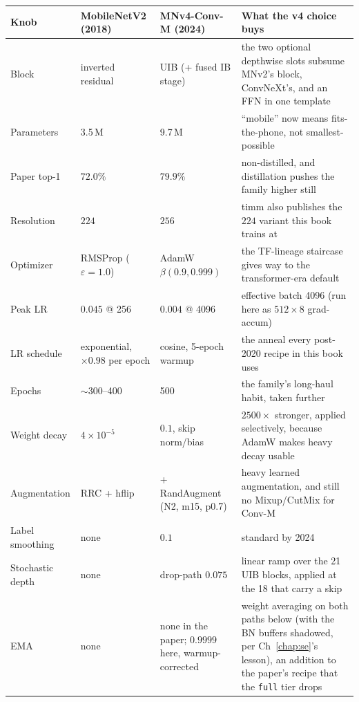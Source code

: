 \begin{center}
\begin{tabular}{@{}l p{2.9cm} p{3.2cm} p{6.3cm}@{}}
\hline
Knob & MobileNetV2 (2018) & MNv4-Conv-M (2024) & What the v4 choice buys \\
\hline
Block         & inverted residual      & UIB (+ fused IB stage)        & the two optional depthwise slots subsume MNv2's block, ConvNeXt's, and an FFN in one template \\
Parameters    & 3.5\,M                 & 9.7\,M                        & ``mobile'' now means fits-the-phone, not smallest-possible \\
Paper top-1   & $72.0\%$               & $79.9\%$                      & non-distilled, and distillation pushes the family higher still \\
Resolution    & $224$                  & $256$                         & timm also publishes the $224$ variant this book trains at \\
Optimizer     & RMSProp ($\varepsilon{=}1.0$) & AdamW $\beta(0.9, 0.999)$ & the TF-lineage staircase gives way to the transformer-era default \\
Peak LR       & $0.045$ @ 256          & $0.004$ @ 4096                & effective batch 4096 (run here as $512 \times 8$ grad-accum) \\
LR schedule   & exponential, $\times0.98$ per epoch & cosine, 5-epoch warmup & the anneal every post-2020 recipe in this book uses \\
Epochs        & $\sim$300--400         & 500                           & the family's long-haul habit, taken further \\
Weight decay  & $4\times10^{-5}$       & $0.1$, skip norm/bias         & $2500\times$ stronger, applied selectively, because AdamW makes heavy decay usable \\
Augmentation  & RRC + hflip            & + RandAugment (N2, m15, p0.7) & heavy learned augmentation, and still no Mixup/CutMix for Conv-M \\
Label smoothing & none                 & $0.1$                         & standard by 2024 \\
Stochastic depth & none                & drop-path $0.075$             & linear ramp over the 21 UIB blocks, applied at the 18 that carry a skip \\
EMA           & none                   & none in the paper; $0.9999$ here, warmup-corrected & weight averaging on both paths below (with the BN buffers shadowed, per Ch~\ref{chap:se}'s lesson), an addition to the paper's recipe that the \texttt{full} tier drops \\
\hline
\end{tabular}
\end{center}

